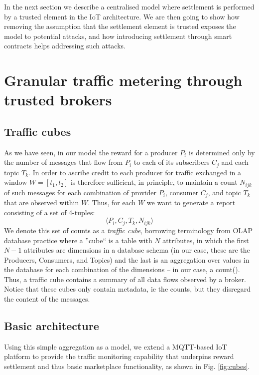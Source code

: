 \documentclass[conference]{IEEEtran}
\begin{document}
In the next section we describe a centralised model where settlement is performed by a trusted element in the IoT architecture.
We are then going to show how removing the assumption that the settlement element is trusted exposes the model to potential attacks, and how introducing settlement through smart contracts helps addressing such attacks.

\section{Granular traffic metering through trusted brokers}

\subsection{Traffic cubes}

As we have seen, in our model the reward for a producer $ P_i $ is determined only by the number of messages that flow from $ P_i $ to each of its subscribers $ C_j $ and each topic $ T_k $.
In order to ascribe credit to each producer for traffic exchanged in a window $ W = [t_1, t_2] $ is therefore sufficient, in principle, to maintain a count $ N_{ijk} $ of such messages for each combination of provider $ P_i $, consumer $ C_j $, and topic $ T_k $ that are observed within $ W $.
Thus, for each $ W $ we want to generate a report consisting of a set of 4-tuples:
\[  \langle P_i, C_j, T_k, N_{ijk} \rangle  \]
We denote this set of counts as a \textit{traffic cube}, borrowing terminology from OLAP database practice where a ''cube`` is a table with $ N $ attributes, in which the first $ N-1 $ attributes are  dimensions in a database schema (in our case, these are the Producers, Consumers, and Topics) and the last is an aggregation over values in the database for each combination of the dimensions -- in our case, a count().
Thus, a traffic cube contains a summary  of all data flows observed by a broker. Notice that these cubes only contain metadata, ie the counts, but they disregard the content of the messages.

\subsection{Basic architecture}

Using this simple aggregation as a model, we extend a  MQTT-based IoT platform to provide the traffic monitoring capability that underpins reward settlement and thus basic marketplace functionality, as shown in Fig. \ref{fig:cubes}.
\end{document}
